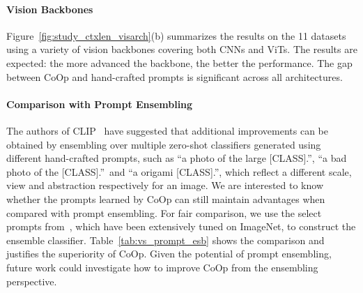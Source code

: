 \paragraph{Vision Backbones}
Figure~\ref{fig:study_ctxlen_visarch}(b) summarizes the results on the 11 datasets using a variety of vision backbones covering both CNNs and ViTs. The results are expected: the more advanced the backbone, the better the performance. The gap between CoOp and hand-crafted prompts is significant across all architectures.

\paragraph{Comparison with Prompt Ensembling}
The authors of CLIP~\citep{radford2021learning} have suggested that additional improvements can be obtained by ensembling over multiple zero-shot classifiers generated using different hand-crafted prompts, such as ``a photo of the large [CLASS].'', ``a bad photo of the [CLASS].''~and ``a origami [CLASS].'', which reflect a different scale, view and abstraction respectively for an image. We are interested to know whether the prompts learned by CoOp can still maintain advantages when compared with prompt ensembling. For fair comparison, we use the select prompts from~\citet{radford2021learning}, which have been extensively tuned on ImageNet, to construct the ensemble classifier. Table~\ref{tab:vs_prompt_esb} shows the comparison and justifies the superiority of CoOp. Given the potential of prompt ensembling, future work could investigate how to improve CoOp from the ensembling perspective.


